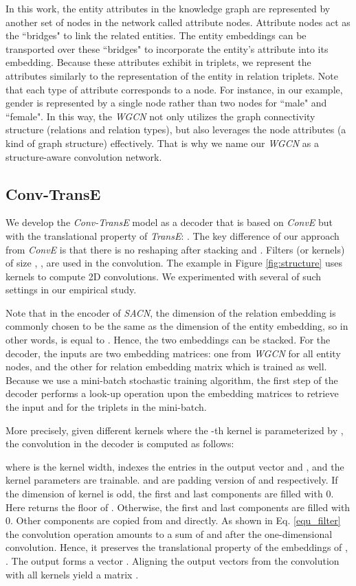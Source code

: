 \documentclass[letterpaper]{article} \usepackage{aaai19}  \usepackage{times}  \usepackage{helvet}  \usepackage{courier}  \usepackage{url}  \usepackage{graphicx}  \usepackage{amsmath}
\begin{document}
In this work, the entity attributes in the knowledge graph are represented by another set of nodes in the network called attribute nodes. Attribute nodes act as the ``bridges" to link the related entities. The entity embeddings can be transported over these ``bridges" to incorporate the entity's attribute into its embedding. Because these attributes exhibit in triplets, we represent the attributes similarly to the representation of the entity  in relation triplets. Note that each type of attribute corresponds to a node. For instance, in our example, gender is represented by a single node rather than two nodes for ``male" and ``female".
In this way, the {\it WGCN} not only utilizes the graph connectivity structure (relations and relation types), but also leverages the node attributes (a kind of graph structure) effectively. That is why we name our {\it WGCN} as a structure-aware convolution network.


\subsection{Conv-TransE}
We develop the {\it Conv-TransE} model as a decoder that is based on {\it ConvE} but with the translational property of {\it TransE}: . 
The key difference of our approach from {\it ConvE} is that there is no reshaping after stacking  and .
Filters (or kernels) of size  , , are used in the convolution. 
The example in Figure \ref{fig:structure} uses  kernels to compute 2D convolutions.
We experimented with several of such settings in our empirical study.

Note that in the encoder of {\it SACN}, 
the dimension of the relation embedding is commonly chosen to be the same as the dimension of the entity embedding, so in other words, is equal to . Hence, the two embeddings can be stacked. For the decoder, the inputs are two embedding matrices: one  from {\it WGCN} for all entity nodes, and the other  for
relation embedding matrix which is trained as well.
Because we use a mini-batch stochastic training algorithm, the first step of the decoder performs a look-up operation upon the embedding matrices to retrieve the input  and  for the triplets in the mini-batch.

More precisely, given  different kernels where the -th kernel is parameterized by , the convolution in the decoder is computed as follows:

where  is the kernel width,  indexes the entries in the output vector and , and the kernel parameters  are trainable.  and  
are padding version of  and  respectively. 
If the dimension  of kernel is odd, the first  and last  components are filled with 0. Here  returns the floor of .
Otherwise, the first  and last  components are filled with 0. 
Other components are copied from  and  directly.
As shown in Eq. \eqref{equ_filter} the convolution operation amounts to a sum of  and  after the one-dimensional convolution. Hence, it preserves the translational property of the embeddings of , . The output forms a vector . Aligning the output vectors from the convolution with all kernels yield a matrix
.
\end{document}
